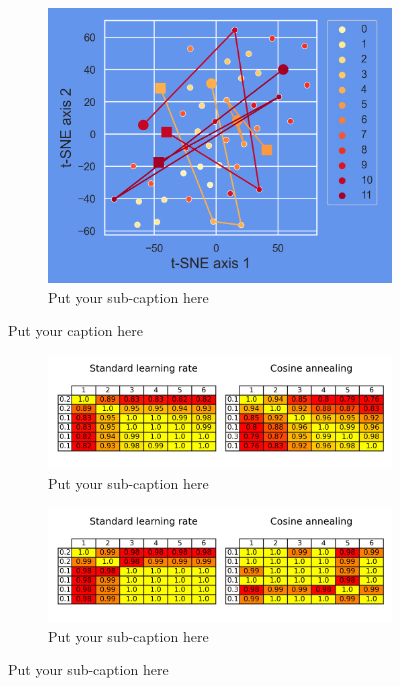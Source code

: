 \begin{figure}[ht]
\begin{subfigure}{.45\textwidth}
		\includegraphics[width=.9\linewidth]{./figs/preds_tSNE_2.png}  
		\caption{Put your sub-caption here}
		\label{fig:sub-second}
	\end{subfigure}
	\caption{Put your caption here}
	\label{fig:fig}
\end{figure}

\blindtext

\begin{figure}[ht]
	\centering
	\begin{subfigure}{1\textwidth}
		\centering
		\includegraphics[width=1\linewidth]{./figs/params_cosine_similarities.png}  
		\caption{Put your sub-caption here}
		\label{fig:sub-first}
	\end{subfigure}
	\begin{subfigure}{1\textwidth}
		\centering
		\includegraphics[width=1\linewidth]{./figs/preds_cosine_similarities.png}  
		\caption{Put your sub-caption here}
		\label{fig:sub-second}
	\end{subfigure}	
\end{figure}

